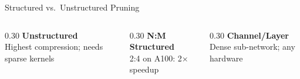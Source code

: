 \documentclass[aspectratio=169, 12pt]{beamer}
\begin{document}
\begin{frame}{Structured vs.\ Unstructured Pruning}
\vspace{0.05cm}
\footnotesize
\begin{columns}[T]
  \begin{column}{0.30\textwidth}
    \centering
    \textcolor{computestroke}{\textbf{Unstructured}}\\
    {\scriptsize Highest compression; needs sparse kernels}
  \end{column}
  \begin{column}{0.30\textwidth}
    \centering
    \textcolor{routingstroke}{\textbf{N:M Structured}}\\
    {\scriptsize 2:4 on A100: 2$\times$ speedup}
  \end{column}
  \begin{column}{0.30\textwidth}
    \centering
    \textcolor{datastroke}{\textbf{Channel/Layer}}\\
    {\scriptsize Dense sub-network; any hardware}
  \end{column}
\end{columns}

\end{frame}
\end{document}
